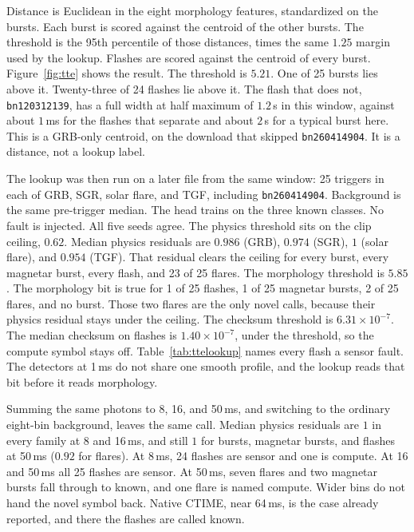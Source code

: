 \documentclass[preprint,12pt]{elsarticle}
\begin{document}
Distance is Euclidean in the eight morphology features, standardized on the bursts. Each burst is scored against the centroid of the other bursts. The threshold is the 95th percentile of those distances, times the same $1.25$ margin used by the lookup. Flashes are scored against the centroid of every burst. Figure~\ref{fig:tte} shows the result. The threshold is $5.21$. One of 25 bursts lies above it. Twenty-three of 24 flashes lie above it. The flash that does not, \texttt{bn120312139}, has a full width at half maximum of $1.2$\,s in this window, against about $1$\,ms for the flashes that separate and about $2$\,s for a typical burst here. This is a GRB-only centroid, on the download that skipped \texttt{bn260414904}. It is a distance, not a lookup label.

The lookup was then run on a later file from the same window: 25 triggers in each of GRB, SGR, solar flare, and TGF, including \texttt{bn260414904}. Background is the same pre-trigger median. The head trains on the three known classes. No fault is injected. All five seeds agree. The physics threshold sits on the clip ceiling, $0.62$. Median physics residuals are $0.986$ (GRB), $0.974$ (SGR), $1$ (solar flare), and $0.954$ (TGF). That residual clears the ceiling for every burst, every magnetar burst, every flash, and 23 of 25 flares. The morphology threshold is $5.85$. The morphology bit is true for 1 of 25 flashes, 1 of 25 magnetar bursts, 2 of 25 flares, and no burst. Those two flares are the only novel calls, because their physics residual stays under the ceiling. The checksum threshold is $6.31\times 10^{-7}$. The median checksum on flashes is $1.40\times 10^{-7}$, under the threshold, so the compute symbol stays off. Table~\ref{tab:ttelookup} names every flash a sensor fault. The detectors at 1\,ms do not share one smooth profile, and the lookup reads that bit before it reads morphology.

Summing the same photons to 8, 16, and 50\,ms, and switching to the ordinary eight-bin background, leaves the same call. Median physics residuals are $1$ in every family at 8 and 16\,ms, and still $1$ for bursts, magnetar bursts, and flashes at 50\,ms ($0.92$ for flares). At 8\,ms, 24 flashes are sensor and one is compute. At 16 and 50\,ms all 25 flashes are sensor. At 50\,ms, seven flares and two magnetar bursts fall through to known, and one flare is named compute. Wider bins do not hand the novel symbol back. Native CTIME, near 64\,ms, is the case already reported, and there the flashes are called known.
\end{document}
